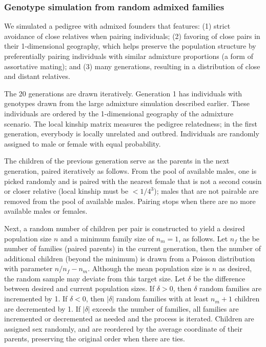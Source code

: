 \documentclass[11pt]{article}
\begin{document}
\subsubsection{Genotype simulation from random admixed families}

We simulated a pedigree with admixed founders that features:
(1) strict avoidance of close relatives when pairing individuals;
(2) favoring of close pairs in their 1-dimensional geography, which helps preserve the population structure by preferentially pairing individuals with similar admixture proportions (a form of assortative mating); and
(3) many generations, resulting in a distribution of close and distant relatives.

The 20 generations are drawn iteratively.
Generation 1 has individuals with genotypes drawn from the large admixture simulation described earlier.
These individuals are ordered by the 1-dimensional geography of the admixture scenario.
The local kinship matrix measures the pedigree relatedness; in the first generation, everybody is locally unrelated and outbred.
Individuals are randomly assigned to male or female with equal probability.

The children of the previous generation serve as the parents in the next generation, paired iteratively as follows.
From the pool of available males, one is picked randomly and is paired with the nearest female that is not a second cousin or closer relative (local kinship must be $< 1/4^3$); males that are not pairable are removed from the pool of available males.
Pairing stops when there are no more available males or females.

Next, a random number of children per pair is constructed to yield a desired population size $n$ and a minimum family size of $n_m=1$, as follows.
Let $n_f$ the be number of families (paired parents) in the current generation, then the number of additional children (beyond the minimum) is drawn from a Poisson distribution with parameter $n/n_f - n_m$.
Although the mean population size is $n$ as desired, the random sample may deviate from this target size.
Let $\delta$ be the difference between desired and current population sizes.
If $\delta > 0$, then $\delta$ random families are incremented by 1.
If $\delta < 0$, then $|\delta|$ random families with at least $n_m+1$ children are decremented by 1.
If $|\delta|$ exceeds the number of families, all families are incremented or decremented as needed and the process is iterated.
Children are assigned sex randomly, and are reordered by the average coordinate of their parents, preserving the original order when there are ties.
\end{document}
